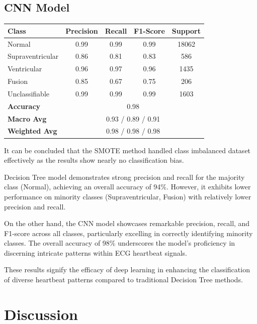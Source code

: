 \documentclass[]{acmsiggraph}
\begin{document}
\subsection{CNN Model}

\begin{center}
\begin{tabular}{lcccc}
\hline
\textbf{Class} & \textbf{Precision} & \textbf{Recall} & \textbf{F1-Score} & \textbf{Support} \\
\hline
Normal & 0.99 & 0.99 & 0.99 & 18062 \\
Supraventricular & 0.86 & 0.81 & 0.83 & 586 \\
Ventricular & 0.96 & 0.97 & 0.96 & 1435 \\
Fusion & 0.85 & 0.67 & 0.75 & 206 \\
Unclassifiable & 0.99 & 0.99 & 0.99 & 1603 \\
\hline
\textbf{Accuracy} & \multicolumn{4}{c}{0.98} \\
\textbf{Macro Avg} & \multicolumn{4}{c}{0.93 / 0.89 / 0.91} \\
\textbf{Weighted Avg} & \multicolumn{4}{c}{0.98 / 0.98 / 0.98} \\
\hline
\end{tabular}
\end{center}

It can be concluded that the SMOTE method handled class imbalanced dataset effectively as the results show nearly no classification bias.

Decision Tree model demonstrates strong precision and recall for the majority class (Normal), achieving an overall accuracy of 94\%. However, it exhibits lower performance on minority classes (Supraventricular, Fusion) with relatively lower precision and recall.

On the other hand, the CNN model showcases remarkable precision, recall, and F1-score across all classes, particularly excelling in correctly identifying minority classes. The overall accuracy of 98\% underscores the model's proficiency in discerning intricate patterns within ECG heartbeat signals. 

These results signify the efficacy of deep learning in enhancing the classification of diverse heartbeat patterns compared to traditional Decision Tree methods.

\section{Discussion}
\end{document}
